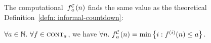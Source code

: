 \noindent The computational~$\cdt{f}{a}(n)$
finds the same value as the theoretical
Definition~\ref{defn: informal-countdown}:
\begin{thm} \label{thm: cdt-repeat}
	\href{https://github.com/inv-ack/inv-ack/blob/7270e64a2600b771f2b1b1b151f7d13fb2ae6c97/countdown.v#L191-L217}{\coq}
	$\forall a \in \mathbb{N}.~ \forall f\in \text{\scshape{cont}}_{a}$, we have
$	\forall n.~ \cdt{f}{a}(n) = \min\left\{ i : f^{(i)}(n) \le a \right\} $.
\end{thm}
